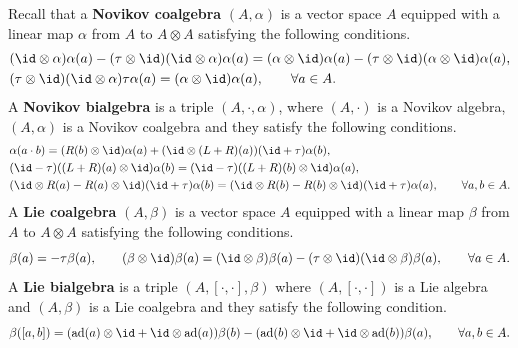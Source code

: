 \documentclass[12pt]{amsart}
\begin{document}
Recall \cite{HBG0} that a {\bf Novikov coalgebra}  $(A,\alpha)$ is
a vector space $A$ equipped with a linear map $\alpha$ from $A$ to
$A\otimes A$ satisfying the following conditions.
\begin{align*}
    &(\id\otimes \alpha)\alpha(a)-(\tau\otimes \id)(\id\otimes \alpha)\alpha(a)=(\alpha\otimes \id)\alpha(a)-(\tau\otimes\id)(\alpha\otimes\id)\alpha(a),\\
    &(\tau\otimes \id)(\id\otimes \alpha)\tau\alpha(a)=(\alpha\otimes \id)\alpha(a), \qquad \forall a\in A.
\end{align*}
A {\bf Novikov bialgebra} is a triple $(A,\cdot, \alpha)$, where
$(A,\cdot)$ is a Novikov algebra, $(A,\alpha)$ is a Novikov
coalgebra and they satisfy the following conditions.
\begin{align*}
    &\alpha(a\cdot b)=(R(b)\otimes \id)\alpha(a)+(\id\otimes (L+R)(a))(\id+\tau)\alpha(b),\\
    &(\id-\tau)( (L+R)(a)\otimes \id)\alpha(b)=(\id-\tau)((L+R)(b)\otimes \id)\alpha(a),\\
    &(\id\otimes R(a)-R(a)\otimes \id)(\id+\tau)\alpha(b)=(\id\otimes R(b)-R(b)\otimes \id)(\id+\tau)\alpha(a),\qquad \forall a,b\in A.
\end{align*}
A {\bf Lie coalgebra} $(A,\beta)$ is a vector space $A$ equipped
with  a linear map $\beta$ from $A$ to $A\otimes A$ satisfying the
following conditions.
\begin{align*}
    \beta(a)=-\tau\beta(a),\qquad
    (\beta\otimes \id)\beta(a)=(\id\otimes \beta)\beta(a)-(\tau\otimes \id)(\id\otimes \beta)\beta(a), \qquad \forall a\in A.
\end{align*}
A {\bf Lie bialgebra} is a triple $(A,[\cdot,\cdot],\beta)$ where
$(A,[\cdot,\cdot])$ is a Lie algebra and $(A,\beta)$ is a Lie
coalgebra and they satisfy the following condition.
\begin{equation*}
    \beta([a,b])=({\rm ad}(a)\otimes \id+\id\otimes {\rm ad}(a)) \beta(b)-({\rm ad}(b)\otimes \id+\id\otimes {\rm ad}(b)) \beta(a),\qquad  \forall a,b\in A.
\end{equation*}
\end{document}
